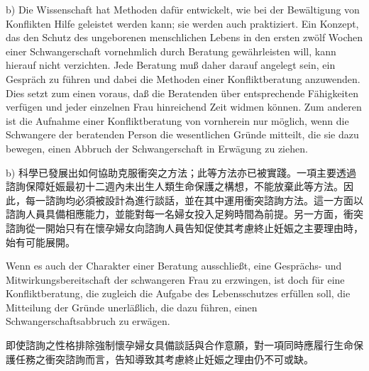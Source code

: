 \documentclass[12pt]{article}
\begin{document}
\begin{sourcepara}[title={原文D.115}]
b) Die Wissenschaft hat Methoden dafür entwickelt, wie bei der Bewältigung von Konflikten Hilfe geleistet werden kann; sie werden auch praktiziert. Ein Konzept, das den Schutz des ungeborenen menschlichen Lebens in den ersten zwölf Wochen einer Schwangerschaft vornehmlich durch Beratung gewährleisten will, kann hierauf nicht verzichten. Jede Beratung muß daher darauf angelegt sein, ein Gespräch zu führen und dabei die Methoden einer Konfliktberatung anzuwenden. Dies setzt zum einen voraus, daß die Beratenden über entsprechende Fähigkeiten verfügen und jeder einzelnen Frau hinreichend Zeit widmen können. Zum anderen ist die Aufnahme einer Konfliktberatung von vornherein nur möglich, wenn die Schwangere der beratenden Person die wesentlichen Gründe mitteilt, die sie dazu bewegen, einen Abbruch der Schwangerschaft in Erwägung zu ziehen.
\end{sourcepara}
\begin{transpara}
b) 科學已發展出如何協助克服衝突之方法；此等方法亦已被實踐。一項主要透過諮詢保障妊娠最初十二週內未出生人類生命保護之構想，不能放棄此等方法。因此，每一諮詢均必須被設計為進行談話，並在其中運用衝突諮詢方法。這一方面以諮詢人員具備相應能力，並能對每一名婦女投入足夠時間為前提。另一方面，衝突諮詢從一開始只有在懷孕婦女向諮詢人員告知促使其考慮終止妊娠之主要理由時，始有可能展開。
\end{transpara}

\begin{sourcepara}[title={原文D.116}]
Wenn es auch der Charakter einer Beratung ausschließt, eine Gesprächs- und Mitwirkungsbereitschaft der schwangeren Frau zu erzwingen, ist doch für eine Konfliktberatung, die zugleich die Aufgabe des Lebensschutzes erfüllen soll, die Mitteilung der Gründe unerläßlich, die dazu führen, einen Schwangerschaftsabbruch zu erwägen.
\end{sourcepara}
\begin{transpara}
即使諮詢之性格排除強制懷孕婦女具備談話與合作意願，對一項同時應履行生命保護任務之衝突諮詢而言，告知導致其考慮終止妊娠之理由仍不可或缺。
\end{transpara}
\end{document}
